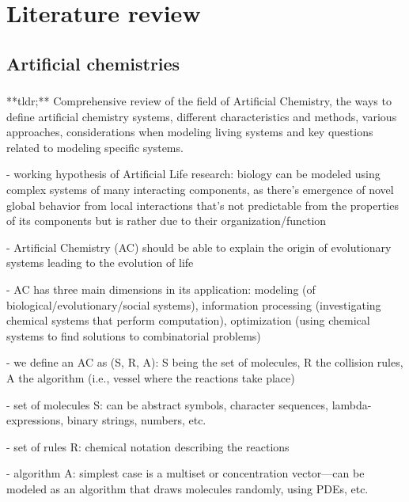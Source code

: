 \documentclass[11pt]{article}
\begin{document}
\tableofcontents
\clearpage

\section{Literature review}

\subsection{Artificial chemistries}

\subsubsection{\texorpdfstring{\cite{dittrich_artificial_2001}}{}}

\begin{markdown}

**tldr;** Comprehensive review of the field of Artificial Chemistry, the ways to define artificial chemistry systems, different characteristics and methods, various approaches, considerations when modeling living systems and key questions related to modeling specific systems.

- working hypothesis of Artificial Life research: biology can be modeled using complex systems of many interacting components, as there’s emergence of novel global behavior from local interactions that’s not predictable from the properties of its components but is rather due to their organization/function
    
- Artificial Chemistry (AC) should be able to explain the origin of evolutionary systems leading to the evolution of life
    
- AC has three main dimensions in its application: modeling (of biological/evolutionary/social systems), information processing (investigating chemical systems that perform computation), optimization (using chemical systems to find solutions to combinatorial problems)
    
- we define an AC as (S, R, A): S being the set of molecules, R the collision rules, A the algorithm (i.e., vessel where the reactions take place)
    
- set of molecules S: can be abstract symbols, character sequences, lambda-expressions, binary strings, numbers, etc.
    
- set of rules R: chemical notation describing the reactions
    
- algorithm A: simplest case is a multiset or concentration vector—can be modeled as an algorithm that draws molecules randomly, using PDEs, etc.
    

\end{markdown}
\end{document}
